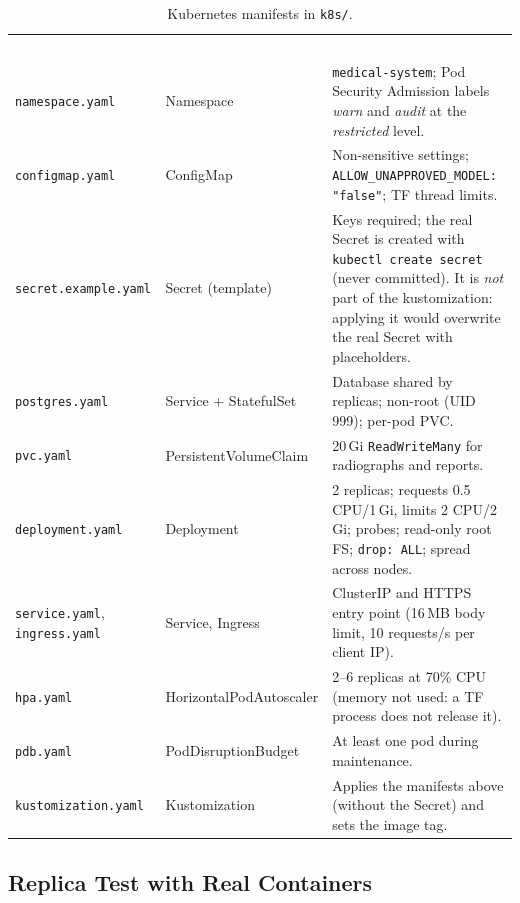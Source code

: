 \documentclass[12pt,a4paper]{article}
\newcommand{\fp}[1]{\nolinkurl{#1}}
\newcommand{\hd}[1]{\textcolor{white}{\textbf{#1}}}
\begin{document}
\begin{table}[H]
\centering
\caption{Kubernetes manifests in \texttt{k8s/}.}
\label{tab:k8s}
\renewcommand{\arraystretch}{1.2}
\begin{tabularx}{\textwidth}{L{3.3cm} L{3.2cm} Y}
\hd{Manifest} & \hd{Kind} & \hd{Purpose} \\
\texttt{namespace.yaml} & Namespace & \texttt{medical-system}; Pod Security Admission labels \emph{warn} and \emph{audit} at the \emph{restricted} level. \\
\texttt{configmap.yaml} & ConfigMap & Non-sensitive settings; \texttt{ALLOW\_UNAPPROVED\_MODEL: "false"}; TF thread limits. \\
\fp{secret.example.yaml} & Secret (template) & Keys required; the real Secret is created with \texttt{kubectl create secret} (never committed). It is \emph{not} part of the kustomization: applying it would overwrite the real Secret with placeholders. \\
\texttt{postgres.yaml} & Service + StatefulSet & Database shared by replicas; non-root (UID 999); per-pod PVC. \\
\texttt{pvc.yaml} & Persistent\-Volume\-Claim & 20\,Gi \texttt{ReadWriteMany} for radiographs and reports. \\
\texttt{deployment.yaml} & Deployment & 2 replicas; requests 0.5 CPU/1\,Gi, limits 2 CPU/2\,Gi; probes; read-only root FS; \texttt{drop: ALL}; spread across nodes. \\
\texttt{service.yaml}, \texttt{ingress.yaml} & Service, Ingress & ClusterIP and HTTPS entry point (16\,MB body limit, 10 requests/s per client IP). \\
\texttt{hpa.yaml} & Horizontal\-Pod\-Autoscaler & 2--6 replicas at 70\% CPU (memory not used: a TF process does not release it). \\
\texttt{pdb.yaml} & Pod\-Disruption\-Budget & At least one pod during maintenance. \\
\fp{kustomization.yaml} & Kustomization & Applies the manifests above (without the Secret) and sets the image tag. \\
\end{tabularx}
\end{table}

\clearpage
\subsection{Replica Test with Real Containers}
\label{sec:replicatest}
\end{document}
